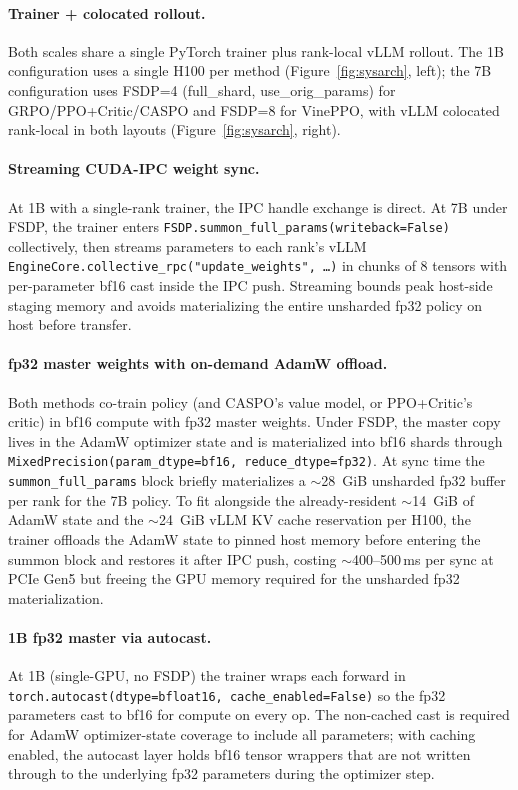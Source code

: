 \documentclass[11pt]{article}
\newcommand{\caspo}{\textsc{CASPO}}
\newcommand{\ppocritic}{PPO+Critic}
\newcommand{\grpo}{GRPO}
\newcommand{\vineppo}{VinePPO}
\begin{document}
\paragraph{Trainer + colocated rollout.}
Both scales share a single PyTorch trainer plus rank-local vLLM rollout. The
1B configuration uses a single H100 per method (Figure~\ref{fig:sysarch},
left); the 7B configuration uses FSDP=4 (full\_shard, use\_orig\_params) for
\grpo{}/\ppocritic{}/\caspo{} and FSDP=8 for \vineppo{}, with vLLM
colocated rank-local in both layouts (Figure~\ref{fig:sysarch}, right).

\paragraph{Streaming CUDA-IPC weight sync.}
At 1B with a single-rank trainer, the IPC handle exchange is direct. At 7B
under FSDP, the trainer enters
\texttt{FSDP.summon\_full\_params(writeback=False)} collectively, then
streams parameters to each rank's vLLM
\texttt{EngineCore.collective\_rpc("update\_weights", \dots)} in chunks of 8
tensors with per-parameter bf16 cast inside the IPC push. Streaming bounds
peak host-side staging memory and avoids materializing the entire
unsharded fp32 policy on host before transfer.

\paragraph{fp32 master weights with on-demand AdamW offload.}
Both methods co-train policy (and \caspo{}'s value model, or \ppocritic{}'s
critic) in bf16 compute with fp32 master weights. Under FSDP, the master
copy lives in the AdamW optimizer state and is materialized into bf16
shards through \texttt{MixedPrecision(param\_dtype=bf16,
reduce\_dtype=fp32)}. At sync time the
\texttt{summon\_full\_params} block briefly materializes a $\sim$28~GiB
unsharded fp32 buffer per rank for the 7B policy. To fit alongside the
already-resident $\sim$14~GiB of AdamW state and the
$\sim$24~GiB vLLM KV cache reservation per H100, the trainer offloads the
AdamW state to pinned host memory before entering the summon block and
restores it after IPC push, costing $\sim$400--500\,ms per sync at PCIe Gen5
but freeing the GPU memory required for the unsharded fp32 materialization.

\paragraph{1B fp32 master via autocast.}
At 1B (single-GPU, no FSDP) the trainer wraps each forward in
\texttt{torch.autocast(dtype=bfloat16, cache\_enabled=False)} so the fp32
parameters cast to bf16 for compute on every op. The non-cached cast is
required for AdamW optimizer-state coverage to include all parameters; with
caching enabled, the autocast layer holds bf16 tensor wrappers that are not
written through to the underlying fp32 parameters during the optimizer step.
\end{document}
